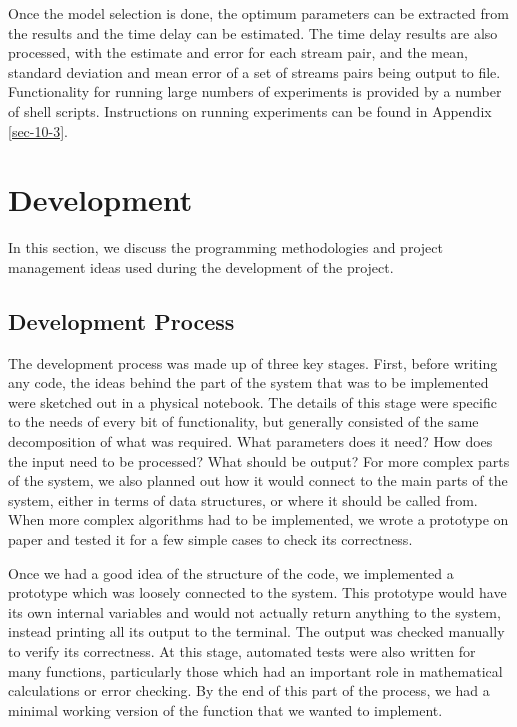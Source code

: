 \documentclass[a4paper,11pt]{article}
\begin{document}
   Once the model selection is done, the optimum parameters can be extracted
   from the results and the time delay can be estimated. The time delay results
   are also processed, with the estimate and error for each stream pair, and the
   mean, standard deviation and mean error of a set of streams pairs being
   output to file. Functionality for running large numbers of experiments is
   provided by a number of shell scripts. Instructions on running experiments
   can be found in Appendix \ref{sec-10-3}.
\section{Development}
\label{sec-4}

In this section, we discuss the programming methodologies and project management
ideas used during the development of the project.
\subsection{Development Process}
\label{sec-4-1}

   The development process was made up of three key stages. First, before
   writing any code, the ideas behind the part of the system that was to be
   implemented were sketched out in a physical notebook. The details of this
   stage were specific to the needs of every bit of functionality, but generally
   consisted of the same decomposition of what was required. What parameters
   does it need? How does the input need to be processed? What should be output?
   For more complex parts of the system, we also planned out how it would
   connect to the main parts of the system, either in terms of data structures,
   or where it should be called from. When more complex algorithms had to be
   implemented, we wrote a prototype on paper and tested it for a few simple
   cases to check its correctness.

   Once we had a good idea of the structure of the code, we implemented a
   prototype which was loosely connected to the system. This prototype would
   have its own internal variables and would not actually return anything to the
   system, instead printing all its output to the terminal. The output was
   checked manually to verify its correctness. At this stage, automated tests
   were also written for many functions, particularly those which had an
   important role in mathematical calculations or error checking. By the end of
   this part of the process, we had a minimal working version of the function
   that we wanted to implement.
\end{document}
